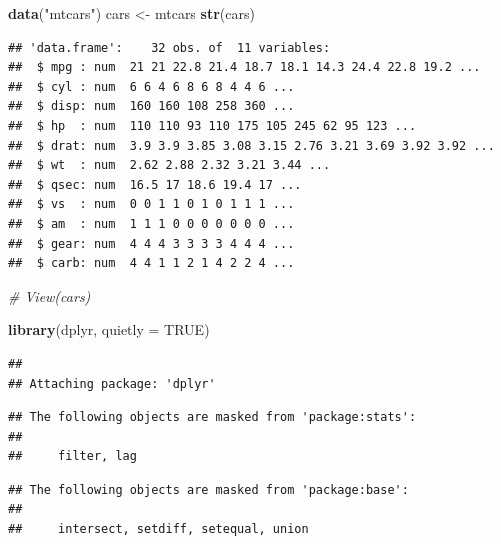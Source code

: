 \documentclass[]{article}
\newenvironment{Shaded}{\begin{snugshade}}{\end{snugshade}}
\newcommand{\CommentTok}[1]{\textcolor[rgb]{0.56,0.35,0.01}{\textit{#1}}}
\newcommand{\DataTypeTok}[1]{\textcolor[rgb]{0.13,0.29,0.53}{#1}}
\newcommand{\KeywordTok}[1]{\textcolor[rgb]{0.13,0.29,0.53}{\textbf{#1}}}
\newcommand{\NormalTok}[1]{#1}
\newcommand{\OperatorTok}[1]{\textcolor[rgb]{0.81,0.36,0.00}{\textbf{#1}}}
\newcommand{\OtherTok}[1]{\textcolor[rgb]{0.56,0.35,0.01}{#1}}
\newcommand{\StringTok}[1]{\textcolor[rgb]{0.31,0.60,0.02}{#1}}
\begin{document}
\begin{Shaded}
\begin{Highlighting}[]
\KeywordTok{data}\NormalTok{(}\StringTok{"mtcars"}\NormalTok{)}
\NormalTok{cars <-}\StringTok{ }\NormalTok{mtcars}
\KeywordTok{str}\NormalTok{(cars)}
\end{Highlighting}
\end{Shaded}

\begin{verbatim}
## 'data.frame':    32 obs. of  11 variables:
##  $ mpg : num  21 21 22.8 21.4 18.7 18.1 14.3 24.4 22.8 19.2 ...
##  $ cyl : num  6 6 4 6 8 6 8 4 4 6 ...
##  $ disp: num  160 160 108 258 360 ...
##  $ hp  : num  110 110 93 110 175 105 245 62 95 123 ...
##  $ drat: num  3.9 3.9 3.85 3.08 3.15 2.76 3.21 3.69 3.92 3.92 ...
##  $ wt  : num  2.62 2.88 2.32 3.21 3.44 ...
##  $ qsec: num  16.5 17 18.6 19.4 17 ...
##  $ vs  : num  0 0 1 1 0 1 0 1 1 1 ...
##  $ am  : num  1 1 1 0 0 0 0 0 0 0 ...
##  $ gear: num  4 4 4 3 3 3 3 4 4 4 ...
##  $ carb: num  4 4 1 1 2 1 4 2 2 4 ...
\end{verbatim}

\begin{Shaded}
\begin{Highlighting}[]
\CommentTok{# View(cars)}

\KeywordTok{library}\NormalTok{(dplyr, }\DataTypeTok{quietly =} \OtherTok{TRUE}\NormalTok{)}
\end{Highlighting}
\end{Shaded}

\begin{verbatim}
## 
## Attaching package: 'dplyr'
\end{verbatim}

\begin{verbatim}
## The following objects are masked from 'package:stats':
## 
##     filter, lag
\end{verbatim}

\begin{verbatim}
## The following objects are masked from 'package:base':
## 
##     intersect, setdiff, setequal, union
\end{verbatim}

\begin{Shaded}
\end{Shaded}
\end{document}
